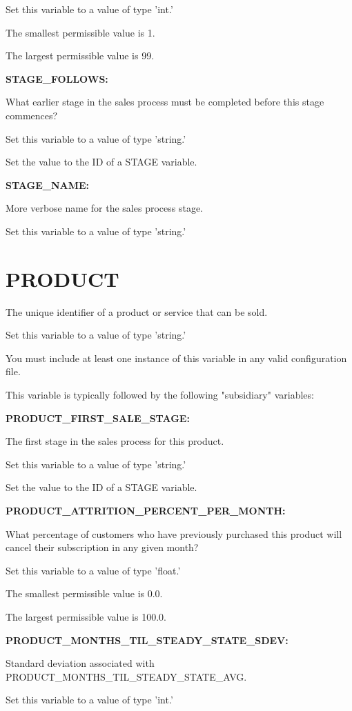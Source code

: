 Set this variable to a value of type 'int.'

The smallest permissible value is 1.

The largest permissible value is 99.


\textbf{STAGE\_FOLLOWS:}


What earlier stage in the sales process must be completed before this stage commences?

Set this variable to a value of type 'string.'

Set the value to the ID of a STAGE variable.


\textbf{STAGE\_NAME:}


More verbose name for the sales process stage.

Set this variable to a value of type 'string.'


\section{PRODUCT}


The unique identifier of a product or service that can be sold.

Set this variable to a value of type 'string.'

You must include at least one instance of this variable in any valid configuration file.

This variable is typically followed by the following "subsidiary" variables:


\textbf{PRODUCT\_FIRST\_SALE\_STAGE:}


The first stage in the sales process for this product.

Set this variable to a value of type 'string.'

Set the value to the ID of a STAGE variable.


\textbf{PRODUCT\_ATTRITION\_PERCENT\_PER\_MONTH:}


What percentage of customers who have previously purchased this product will cancel their subscription in any given month?

Set this variable to a value of type 'float.'

The smallest permissible value is 0.0.

The largest permissible value is 100.0.


\textbf{PRODUCT\_MONTHS\_TIL\_STEADY\_STATE\_SDEV:}


Standard deviation associated with PRODUCT\_MONTHS\_TIL\_STEADY\_STATE\_AVG.

Set this variable to a value of type 'int.'

